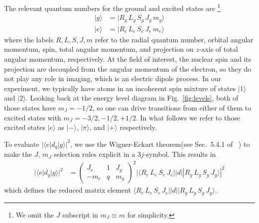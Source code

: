 The relevant quantum numbers for the ground and excited states are
\footnote{We omit the $J$ subscript in $m_{J}\equiv m$ for simplicity.}
\begin{align}
|g\rangle & = | R_{g}\, L_{g}\,S_{g}\,J_{g}\,m_{g} \rangle \\
|e\rangle & = | R_{e}\, L_{e}\,S_{e}\,J_{e}\,m_{e} \rangle 
\end{align}
where the labels $R,L,S,J,m$ refer to the radial quantum number, orbital
angular momentum, spin, total angular momentum, and projection on $z$-axis of
total angular momentum, respectively.  At the field of interest, the nuclear
spin and its projection are decoupled from the angular momentum of the
electron,  so they do not play any role in imaging, which is an electric dipole
process.  In our experiment, we typically have atoms in an incoherent spin
mixture of states $|1\rangle$ and $|2\rangle$. Looking back at the energy level
diagram in Fig.~\ref{fig:levels}, both of those states have $m_{J}=-1/2$, so
one can drive transitions from either of them to excited states with
$m_{J}=-3/2, -1/2, +1/2$.  In what follows we refer to those excited states
$|e\rangle$ as $|-\rangle$, $|\pi\rangle$, and $|+\rangle$ respectively. 

 
To evaluate $ | \langle e | d_{q} | g \rangle | ^{2} $, we use the
Wigner-Eckart theorem(see Sec.~5.4.1 of ~\cite{edmonds1996angular}) to make the
$J$, $m_{J}$ selection rules explicit in a 3$j$-symbol.  This results in  
\begin{align}
|\langle e | d_{q} | g \rangle|^{2} & = \begin{pmatrix} J_{e} & 1 & J_{g} \\ -m_{e} & q & m_{g} \end{pmatrix}^{2}
|\langle R_{e}\, L_{e}\,S_{e}\,J_{e} || d || R_{g}\, L_{g}\,S_{g}\,J_{g} \rangle|^{2}
\end{align}
which defines the reduced matrix element $\langle R_{e}\, L_{e}\,S_{e}\,J_{e} || d || R_{g}\, L_{g}\,S_{g}\,J_{g} \rangle$. 

